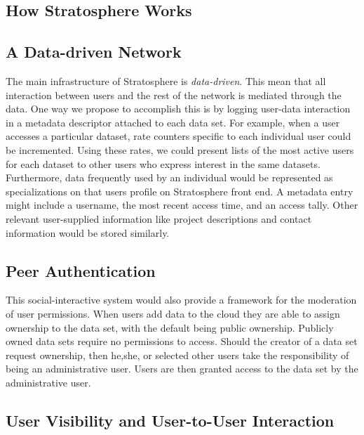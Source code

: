 \begin{multicols*}{2}
\section{How Stratosphere Works}
\label{sec:how}

\subsection{A Data-driven Network}

The main infrastructure of Stratosphere is \emph{data-driven}. This
mean that all interaction between users and the rest of the network is
mediated through the data. One way we propose to accomplish this is by logging
user-data interaction in a metadata descriptor attached to each data
set. For example, when a user accesses a particular dataset, 
rate counters specific to each individual user
could be incremented. Using these rates, we could present lists of the
most active users for each dataset to other users who express interest
in the same datasets. Furthermore, data frequently used by an
individual would be represented as specializations on that users
profile on Stratosphere front end. A metadata entry might 
include a username, the most recent access time, and an access tally. 
Other relevant user-supplied information like project descriptions 
and contact information would be stored similarly.



\subsection{Peer Authentication}

This social-interactive system would also provide a framework for
the moderation of user permissions.  When 
users add data to the cloud they are able to assign
ownership to the data set, with the default being public
ownership. Publicly owned data sets require no permissions to access.
Should the creator of a data set request ownership, then he,she, or
selected other users take the responsibility of being an
administrative user. Users are then granted access to the data set by
the administrative user.

\subsection{User Visibility and User-to-User Interaction}


\end{multicols*}

